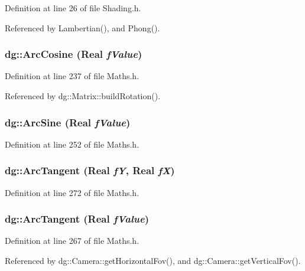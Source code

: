 Definition at line 26 of file Shading.h.

Referenced by Lambertian(), and Phong().
\subsubsection{ dg::Arc\-Cosine ({\bf Real} {\em f\-Value})\hspace{0.3cm}{\tt  [inline]}}\label{namespacedg_a111}




Definition at line 237 of file Maths.h.

Referenced by dg::Matrix::build\-Rotation().
\subsubsection{ dg::Arc\-Sine ({\bf Real} {\em f\-Value})\hspace{0.3cm}{\tt  [inline]}}\label{namespacedg_a112}




Definition at line 252 of file Maths.h.
\subsubsection{ dg::Arc\-Tangent ({\bf Real} {\em f\-Y}, {\bf Real} {\em f\-X})\hspace{0.3cm}{\tt  [inline]}}\label{namespacedg_a114}




Definition at line 272 of file Maths.h.
\subsubsection{ dg::Arc\-Tangent ({\bf Real} {\em f\-Value})\hspace{0.3cm}{\tt  [inline]}}\label{namespacedg_a113}




Definition at line 267 of file Maths.h.

Referenced by dg::Camera::get\-Horizontal\-Fov(), and dg::Camera::get\-Vertical\-Fov().

